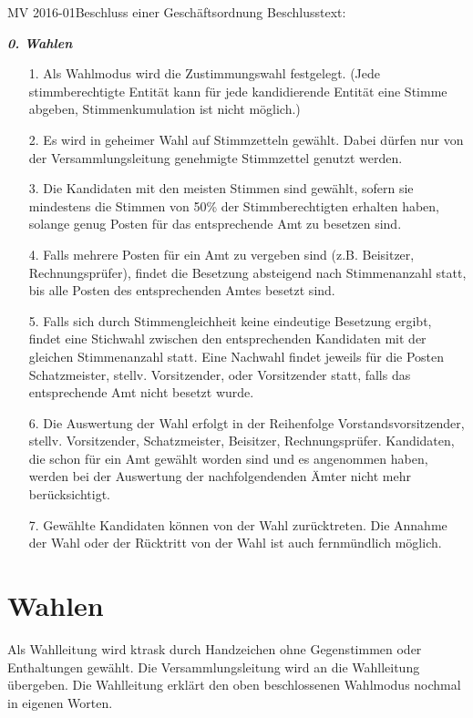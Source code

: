 \documentclass[parskip=half-]{s0minutes}
\begin{document}
\begin{resolution}{MV 2016-01}{}{Beschluss einer
	Geschäftsordnung}{}
	Beschlusstext:

	\itshape
	\textbf{0. Wahlen}
	\begin{enumerate}
		\item[1.] Als Wahlmodus wird die Zustimmungswahl festgelegt. (Jede
			stimmberechtigte Entität kann für jede kandidierende Entität eine Stimme
			abgeben, Stimmenkumulation ist nicht möglich.)
		\item[2.] Es wird in geheimer Wahl auf Stimmzetteln gewählt. Dabei dürfen
			nur von der Versammlungsleitung genehmigte Stimmzettel genutzt werden.
		\item[3.] Die Kandidaten mit den meisten Stimmen sind gewählt, sofern sie
			mindestens die Stimmen von 50\% der Stimmberechtigten erhalten haben,
			solange genug Posten für das entsprechende Amt zu besetzen sind.
		\item[4.] Falls mehrere Posten für ein Amt zu vergeben sind (z.B. Beisitzer,
			Rechnungsprüfer), findet die Besetzung absteigend nach Stimmenanzahl
			statt, bis alle Posten des entsprechenden Amtes besetzt sind.
		\item[5.] Falls sich durch Stimmengleichheit keine eindeutige Besetzung
			ergibt, findet eine Stichwahl zwischen den entsprechenden Kandidaten mit
			der gleichen Stimmenanzahl statt. Eine Nachwahl findet jeweils für die
			Posten Schatzmeister, stellv. Vorsitzender, oder Vorsitzender statt, falls
			das entsprechende Amt nicht besetzt wurde.
		\item[6.] Die Auswertung der Wahl erfolgt in der Reihenfolge
			Vorstandsvorsitzender, stellv. Vorsitzender, Schatzmeister, Beisitzer,
			Rechnungsprüfer. Kandidaten, die schon für ein Amt gewählt worden sind und
			es angenommen haben, werden bei der Auswertung der nachfolgendenden Ämter
			nicht mehr berücksichtigt.
		\item[7.] Gewählte Kandidaten können von der Wahl zurücktreten. Die Annahme
			der Wahl oder der Rücktritt von der Wahl ist auch fernmündlich möglich.
	\end{enumerate}
\end{resolution}

\section{Wahlen}

Als Wahlleitung wird ktrask durch Handzeichen ohne Gegenstimmen oder
Enthaltungen gewählt. Die Versammlungsleitung wird an die Wahlleitung übergeben.
Die Wahlleitung erklärt den oben beschlossenen Wahlmodus nochmal in eigenen
Worten.
\end{document}
